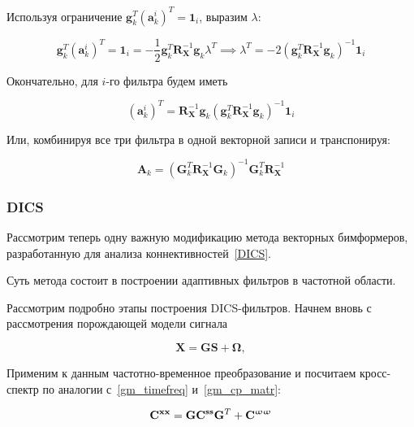 Используя ограничение $\mathbf{g}_k^T (\mathbf{a}_k^i)^T = \mathbf{1}_i$, выразим $\lambda$:

\begin{equation}
    \mathbf{g}_k^T (\mathbf{a}_k^i)^T = \mathbf{1}_i =
    - \frac{1}{2}\mathbf{g}_k^T\mathbf{R}_\mathbf{X}^{-1} \mathbf{g}_k \lambda^T \implies
    \lambda^T = - 2{(\mathbf{g}_k^T\mathbf{R}_\mathbf{X}^{-1} \mathbf{g}_k)}^{-1} \mathbf{1}_i
\end{equation}

Окончательно, для $i$-го фильтра будем иметь

\begin{equation}
    (\mathbf{a}_k^i)^T = \mathbf{R}_\mathbf{X}^{-1} \mathbf{g}_k{(\mathbf{g}_k^T\mathbf{R}_\mathbf{X}^{-1} \mathbf{g}_k)}^{-1} \mathbf{1}_i
    \label{lcmv_filters_vec_comp}
\end{equation}

Или, комбинируя все три фильтра в одной векторной записи и транспонируя:

\begin{equation}
    \mathbf{A}_k =
    {(\mathbf{G}_k^T\mathbf{R}_\mathbf{X}^{-1} \mathbf{G}_k)}^{-1} \mathbf{G}_k^T \mathbf{R}_\mathbf{X}^{-1}
    \label{lcmv_filters_vec}
\end{equation}

\subsubsection{DICS}
\label{DICS_subsection}
Рассмотрим теперь одну важную модификацию метода векторных бимформеров,
разработанную для анализа коннективностей~\ref{DICS}.

Суть метода состоит в построении адаптивных фильтров в частотной области.

Рассмотрим подробно этапы построения DICS-фильтров.
Начнем вновь с рассмотрения порождающей модели сигнала

\begin{equation}
    \mathbf{X} = \mathbf{G} \mathbf{S} + \mathbf{\Omega},
    \label{gm_dics}
\end{equation}


Применим к данным частотно-временное преобразование и посчитаем кросс-спектр по аналогии
с~\ref{gm_timefreq} и~\ref{gm_cp_matr}:

\begin{gather}
    \mathbf{C}^{\mathbf{x x}} = \mathbf{G} \mathbf{C}^{\mathbf{s s}} \mathbf{G}^T + \mathbf{C}^{\mathbf{\upomega \upomega}}
    \label{gm_cp_matr}
\end{gather}

